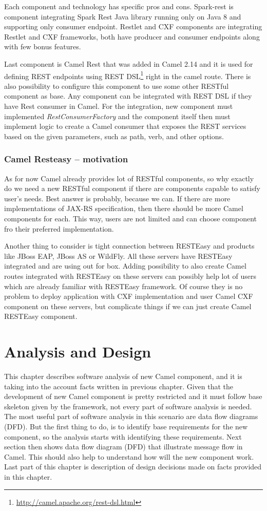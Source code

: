 \documentclass[12pt,final,oneside]{fithesis2}
\begin{document}
Each component and technology has specific pros and cons. Spark-rest is component integrating Spark Rest Java library running only on Java 8 and supporting only consumer endpoint. Restlet and CXF components are integrating Restlet and CXF frameworks, both have producer and consumer endpoints along with few bonus features. 

Last component is Camel Rest that was added in Camel 2.14 and it is used for defining REST endpoints using REST DSL\footnote{\url{http://camel.apache.org/rest-dsl.html}} right in the camel route. There is also possibility to configure this component to use some other RESTful component as base. Any component can be integrated with REST DSL if they have Rest consumer in Camel. For the integration, new component must implemented \textit{RestConsumerFactory} and the component itself then must implement logic to create a Camel consumer that exposes the REST services based on the given parameters, such as path, verb, and other options.

\subsection{Camel Resteasy -- motivation}
As for now Camel already provides lot of RESTful components, so why exactly do we need a new RESTful component if there are components capable to satisfy user's needs. Best answer is probably, because we can. If there are more implementations of JAX-RS specification, then there should be more Camel components for each. This way, users are not limited and can choose component fro their preferred implementation. 

Another thing to consider is tight connection between RESTEasy and products like JBoss EAP, JBoss AS or WildFly. All these servers have RESTEasy integrated and are using out for box. Adding possibility to also create Camel routes integrated with RESTEasy on these servers can possibly help lot of users which are already familiar with RESTEasy framework. Of course they is no problem to deploy application with CXF implementation and user Camel CXF component on these servers, but complicate things if we can just create Camel RESTEasy component. 

%
\chapter{Analysis and Design}
This chapter describes software analysis of new Camel component, and it is taking into the account facts written in previous chapter. Given that the development of new Camel component is pretty restricted and it must follow base skeleton given by the framework, not every part of software analysis is needed. The most useful part of software analysis in this scenario are data flow diagrams (DFD). But the first thing to do, is to identify base requirements for the new component, so the analysis starts with identifying these requirements. Next section then shows data flow diagram (DFD) that illustrate message flow in Camel. This should also help to understand how will the new component work. Last part of this chapter is description of design decisions made on facts provided in this chapter. 
\end{document}
